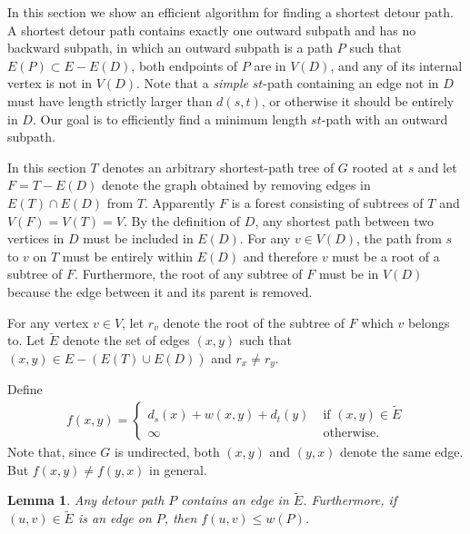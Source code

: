 \documentclass[review]{elsarticle}
\def\squarebox#1{\hbox to #1{\hfill\vbox to #1{\vfill}}}
\renewcommand{\qed}{\hspace*{\fill}
            \vbox{\hrule\hbox{\vrule\squarebox{.667em}\vrule}\hrule}\smallskip\newline}
\newtheorem{lem}[thm]{Lemma}
\begin{document}
In this section we show an efficient algorithm for finding a
shortest detour path. A shortest detour path contains exactly one
outward subpath and has no backward subpath, in which an outward
subpath is a path $P$ such that $E(P)\subset E-E(D)$, both endpoints
of $P$ are in $V(D)$, and any of its internal vertex is not in
$V(D)$. Note that a \emph{simple} $st$-path containing an edge not
in $D$ must have length strictly larger than $d(s,t)$, or otherwise
it should be entirely in $D$. Our goal is to efficiently find a
minimum length $st$-path with an outward subpath.

In this section $T$ denotes an arbitrary shortest-path tree of $G$
rooted at $s$ and let $F=T-E(D)$ denote the graph obtained by
removing edges in $E(T)\cap E(D)$ from $T$. Apparently $F$ is a
forest consisting of subtrees of $T$ and $V(F)=V(T)=V$. By the
definition of $D$, any shortest path between two vertices in $D$
must be included in $E(D)$. For any $v\in V(D)$, the path from $s$
to $v$ on $T$ must be entirely within $E(D)$ and therefore $v$ must
be a root of a subtree of $F$. Furthermore, the root of any subtree
of $F$ must be in $V(D)$ because the edge between it and its parent
is removed.
\begin{defi}
For any vertex $v\in V$, let $r_v$ denote the root of the subtree of
$F$ which $v$ belongs to. Let $\widetilde{E}$ denote the set of
edges $(x,y)$ such that $(x,y)\in E-(E(T)\cup E(D))$ and $r_x\neq
r_y$.
\end{defi}


Define
\begin{eqnarray}
f(x,y)=\left\{\begin{array}{ll}
d_s(x)+w(x,y)+d_t(y)\;& \mbox{if }(x,y)\in \widetilde{E}\\
\infty&\mbox{otherwise.}
\end{array}
\right.
\end{eqnarray}
Note that, since $G$ is undirected, both $(x,y)$ and $(y,x)$ denote
the same edge. But $f(x,y)\neq f(y,x)$ in general.

\begin{lem}\label{out1}
Any detour path $P$ contains an edge in $\widetilde{E}$.
Furthermore, if $(u,v)\in \widetilde{E}$ is an edge on $P$, then
$f(u,v)\leqslant w(P)$.
\end{lem}
\end{document}
